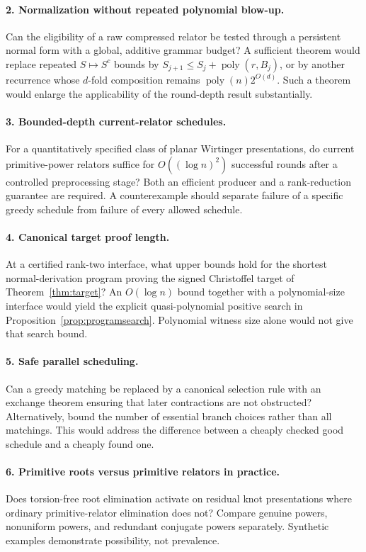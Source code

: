 \documentclass[11pt,letterpaper]{article}
\theoremstyle{definition}
\newcommand{\poly}{\operatorname{poly}}
\begin{document}
\paragraph{2. Normalization without repeated polynomial blow-up.}
Can the eligibility of a raw compressed relator be tested through a persistent
normal form with a global, additive grammar budget? A sufficient theorem
would replace repeated $S\mapsto S^c$ bounds by
$S_{j+1}\leq S_j+\poly(r,B_j)$, or by another recurrence whose $d$-fold
composition remains $\poly(n)2^{O(d)}$. Such a theorem would enlarge the
applicability of the round-depth result substantially.

\paragraph{3. Bounded-depth current-relator schedules.}
For a quantitatively specified class of planar Wirtinger presentations, do
current primitive-power relators suffice for $O((\log n)^2)$ successful
rounds after a controlled preprocessing stage? Both an efficient producer
and a rank-reduction guarantee are required. A counterexample should
separate failure of a specific greedy schedule from failure of every
allowed schedule.

\paragraph{4. Canonical target proof length.}
At a certified rank-two interface, what upper bounds hold for the shortest
normal-derivation program proving the signed Christoffel target of
Theorem~\ref{thm:target}? An $O(\log n)$ bound together with a polynomial-size
interface would yield the explicit quasi-polynomial positive search in
Proposition~\ref{prop:programsearch}. Polynomial witness size alone would
not give that search bound.

\paragraph{5. Safe parallel scheduling.}
Can a greedy matching be replaced by a canonical selection rule with an
exchange theorem ensuring that later contractions are not obstructed?
Alternatively, bound the number of essential branch choices rather than
all matchings. This would address the difference between a cheaply checked
good schedule and a cheaply found one.

\paragraph{6. Primitive roots versus primitive relators in practice.}
Does torsion-free root elimination activate on residual knot presentations
where ordinary primitive-relator elimination does not? Compare genuine
powers, nonuniform powers, and redundant conjugate powers separately.
Synthetic examples demonstrate possibility, not prevalence.
\end{document}
